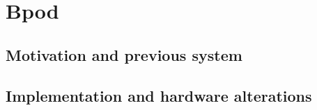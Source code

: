 \section{Bpod}
\label{sec:sectionc}
\subsection{Motivation and previous system}
\label{subsec:subasectionC}
\subsection{Implementation and hardware alterations}
\label{subsec:subbsectionC}